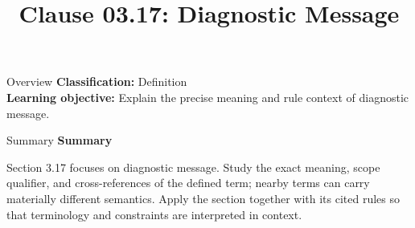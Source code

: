 \documentclass[10pt,letterpaper]{article}
\title{Clause 03.17: Diagnostic Message}
\author{}
\date{}
\begin{document}
\maketitle
\begin{CornellOverviewBox}{Overview}
\textbf{Classification:} Definition\\[2pt]
\textbf{Learning objective:} Explain the precise meaning and rule context of diagnostic message.
\end{CornellOverviewBox}\begin{CornellSummaryBox}{Summary}
{\sffamily\bfseries\color{Accent} Summary}\par\vspace{3pt}Section 3.17 focuses on diagnostic message. Study the exact meaning, scope qualifier, and cross-references of the defined term; nearby terms can carry materially different semantics. Apply the section together with its cited rules so that terminology and constraints are interpreted in context.
\end{CornellSummaryBox}
\end{document}
